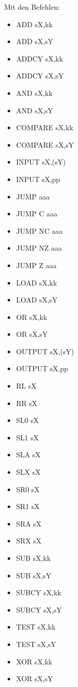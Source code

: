\documentclass[bibliography=totoc,listof=totoc,index=totoc]{scrartcl}
\begin{document}
Mit den Befehlen:
\begin{multicols}{3}
\begin{itemize}
    \item ADD sX,kk
    \item ADD sX,sY
    \item ADDCY sX,kk
    \item ADDCY sX,sY
    \item AND sX,kk
    \item AND sX,sY
    \item COMPARE sX,kk
    \item COMPARE sX,sY
    \item INPUT sX,(sY)
    \item INPUT sX,pp
    \item JUMP aaa
    \item JUMP C aaa
    \item JUMP NC aaa
    \item JUMP NZ aaa
    \item JUMP Z aaa
    \item LOAD sX,kk
    \item LOAD sX,sY
    \item OR sX,kk
    \item OR sX,sY
    \item OUTPUT sX,(sY)
    \item OUTPUT sX,pp
    \item RL sX
    \item RR sX
    \item SL0 sX
    \item SL1 sX
    \item SLA sX
    \item SLX sX
    \item SR0 sX
    \item SR1 sX
    \item SRA sX
    \item SRX sX
    \item SUB sX,kk
    \item SUB sX,sY
    \item SUBCY sX,kk
    \item SUBCY sX,sY
    \item TEST sX,kk
    \item TEST sX,sY
    \item XOR sX,kk
    \item XOR sX,sY
\end{itemize}
\end{multicols}
\end{document}
